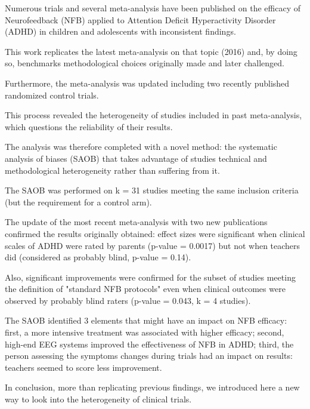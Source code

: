 



\noindent Numerous trials and several meta-analysis have been published on the efficacy of Neurofeedback (NFB) applied
to Attention Deficit Hyperactivity Disorder (ADHD) in children and adolescents with inconsistent findings.

This work replicates the latest meta-analysis on that topic (2016) and, by doing so, benchmarks methodological choices
originally made and later challenged.

Furthermore, the meta-analysis was updated including two recently published randomized control trials.

This process revealed the heterogeneity of studies included in past meta-analysis, which questions the reliability of
their results.

The analysis was therefore completed with a novel method: the systematic analysis of biases (SAOB) that takes advantage
of studies technical and methodological heterogeneity rather than suffering from it.

The SAOB was performed on k = 31 studies meeting the same inclusion criteria (but the requirement for a control arm).

The update of the most recent meta-analysis with two new publications confirmed the results originally obtained: effect
sizes were significant when clinical scales of ADHD were rated by parents (p-value = 0.0017) but not when teachers did
(considered as probably blind, p-value = 0.14).

Also, significant improvements were confirmed for the subset of studies meeting the definition of "standard NFB
protocols" even when clinical outcomes were observed by probably blind raters (p-value = 0.043, k = 4 studies).

The SAOB identified 3 elements that might have an impact on NFB efficacy: first, a more intensive treatment was
associated with higher efficacy; second, high-end EEG systems improved the effectiveness of NFB in ADHD; third, the
person assessing the symptoms changes during trials had an impact on results: teachers seemed to score less improvement.

In conclusion, more than replicating previous findings, we introduced here a new way to look into the heterogeneity of
clinical trials.  

